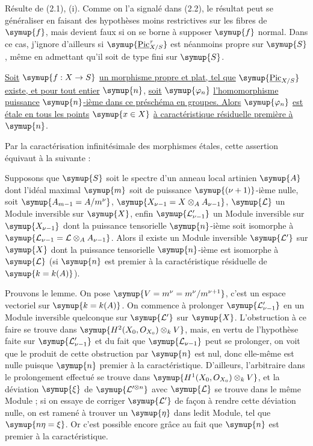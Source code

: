 Résulte de (2.1), (i). Comme on l'a signalé dans (2.2), le résultat peut se
généraliser en faisant des hypothèses moins restrictives sur les fibres de $\symup{f}$,
mais devient faux si on se borne à supposer $\symup{f}$ normal. Dans ce cas, j'ignore
d'ailleurs si $\symup{\underline{\operatorname{Pic}}_{X/S}^\tau}$ est néanmoins propre sur $\symup{S}$,
même en admettant qu'il soit de type fini sur $\symup{S}$.

 \uline{Soit} $\symup{f:X\to S}$ \uline{un morphisme propre et
plat, tel que} $\symup{\underline{\operatorname{Pic}}_{X/S}}$ \uline{existe, et pour tout entier} $\symup{n}$, \uline{soit}
$\symup{\varphi_n}$ \uline{l'homomorphisme puissance} $\symup{n}$\uline{-ième dans ce préschéma en groupes.
Alors} $\symup{\varphi_n}$ \uline{est étale en tous les points}
$\symup{x\in X}$ \uline{à
caractéristique résiduelle première à} $\symup{n}$.

Par la caractérisation infinitésimale des morphismes étales, cette assertion
équivaut à la suivante :

 Supposons que $\symup{S}$ soit le spectre d'un anneau local
artinien $\symup{A}$ dont l'idéal maximal $\symup{m}$ soit de puissance
$\symup{(\nu+1)}$-ième nulle, soit $\symup{A_{m-1}=A/m^\nu}$, $\symup{X_{\nu-1}=X\otimes_A A_{\nu-1}}$, $\symup{\mathcal L}$ un Module inversible sur $\symup{X}$, enfin $\symup{\mathcal L'_{\nu-1}}$ un
Module inversible sur $\symup{X_{\nu-1}}$ dont la puissance tensorielle $\symup{n}$-ième soit
isomorphe à $\symup{\mathcal L_{\nu-1}=\mathcal L\otimes_A A_{\nu-1}}$. Alors il existe un Module inversible $\symup{\mathcal L'}$ sur $\symup{X}$ dont la puissance
tensorielle $\symup{n}$-ième est isomorphe à $\symup{\mathcal L}$ (si $\symup{n}$ est premier à la
caractéristique résiduelle de $\symup{k=k(A)}$).

Prouvons le lemme. On pose $\symup{V=m^\nu=m^\nu/m^{\nu+1}}$, c'est un espace vectoriel sur $\symup{k=k(A)}$. On commence à prolonger
$\symup{\mathcal L'_{\nu-1}}$ en un Module inversible quelconque sur $\symup{\mathcal L'}$ sur $\symup{X}$.
L'obstruction à ce faire se trouve dans $\symup{H^2(X_0,O_{X_0})\otimes_k V}$, mais, en vertu de l'hypothèse faite sur $\symup{\mathcal L'_{\nu-1}}$ et du fait que
$\symup{\mathcal L_{\nu-1}}$ peut se prolonger, on voit que le produit de cette
obstruction par $\symup{n}$ est nul, donc elle-même est nulle puisque $\symup{n}$ premier
à la caractéristique. D'ailleurs, l'arbitraire dans le prolongement effectué
se trouve dans $\symup{H^1(X_0,O_{X_0})\otimes_k V}$, et la déviation $\symup{\xi}$ de $\symup{\mathcal L'^{\otimes n}}$ avec $\symup{\mathcal L}$ se trouve
dans le même Module ; si on essaye de corriger $\symup{\mathcal L'}$ de façon à rendre
cette déviation nulle, on est ramené à trouver un $\symup{\eta}$ dans ledit Module,
tel que $\symup{n\eta=\xi}$. Or c'est possible encore grâce au fait que $\symup{n}$ est
premier à la caractéristique.

